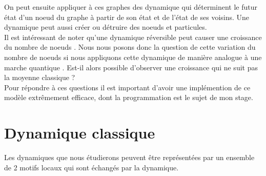 \documentclass[11pts,french]{article}
\begin{document}
On peut ensuite appliquer à ces graphes des dynamique qui déterminent le futur état d'un noeud du graphe à partir de son état et de l'état de ses voisins. Une dynamique peut aussi créer ou détruire des noeuds et particules. \\

Il est intéressant de noter qu'une dynamique réversible peut causer une croissance du nombre de noeuds \cite{meyer1}. Nous nous posons donc la question de cette variation du nombre de noeuds si nous appliquons cette dynamique de manière analogue à une marche quantique \cite{meyer2}. Est-il alors possible d'observer une croissance qui ne suit pas la moyenne classique ? \\

Pour répondre à ces questions il est important d'avoir une implémention de ce modèle extrêmement efficace, dont la programmation est le sujet de mon stage.

\section{ Dynamique classique }

Les dynamiques que nous étudierons peuvent être représentées par un ensemble de 2 motifs locaux qui sont échangés par la dynamique.
\end{document}
